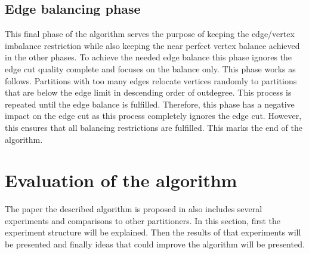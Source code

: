 \documentclass[acmsmall,nonacm,screen,review]{acmart}
\begin{document}
\subsection{Edge balancing phase}
This final phase of the algorithm serves the purpose of keeping the edge/vertex imbalance restriction while also keeping the near perfect vertex balance achieved in the other phases. To achieve the needed edge balance this phase ignores the edge cut quality complete and focuses on the balance only. This phase works as follows. Partitions with too many edges relocate vertices randomly to partitions that are below the edge limit in descending order of outdegree. This process is repeated until the edge balance is fulfilled. Therefore, this phase has a negative impact on the edge cut as this process completely ignores the edge cut. However, this ensures that all balancing restrictions are fulfilled. This marks the end of the algorithm.
\section{Evaluation of the algorithm}
The paper the described algorithm is proposed in also includes several experiments and comparisons to other partitioners. In this section, first the experiment structure will be explained. Then the results of that experiments will be presented and finally ideas that could improve the algorithm will be presented.
\end{document}
